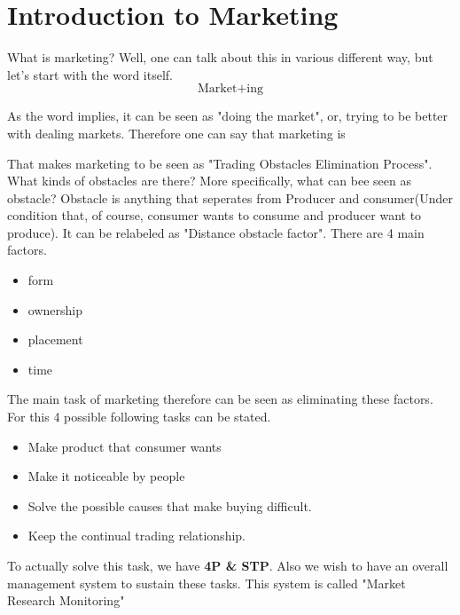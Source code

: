 \documentclass[12pt]{article}
\begin{document}
\maketitle
\newpage

\section{Introduction to Marketing}

What is marketing? Well, one can talk about this in various different way, but let's start with the word itself.
$$ \text{Market}+\text{ing} $$

As the word implies, it can be seen as "doing the market", or, trying to be better with dealing markets. Therefore one can say that marketing is

\begin{tcolorbox}
\end{tcolorbox}

That makes marketing to be seen as "Trading Obstacles Elimination Process". What kinds of obstacles are there? More specifically, what can bee seen as obstacle? Obstacle is anything that seperates from Producer and consumer(Under condition that, of course, consumer wants to consume and producer want to produce). It can be relabeled as "Distance obstacle factor". There are 4 main factors.

\begin{itemize}
	\item form
	\item ownership
	\item placement
	\item time
\end{itemize}
The main task of marketing therefore can be seen as eliminating these factors. For this 4 possible following tasks can be stated.

\begin{itemize}
	\item Make product that consumer wants
	\item Make it noticeable by people
	\item Solve the possible causes that make buying difficult.
	\item Keep the continual trading relationship.
\end{itemize}
To actually solve this task, we have \textbf{4P \& STP}. Also we wish to have
an overall management system to sustain these tasks. This system is called "Market Research Monitoring"
\end{document}
